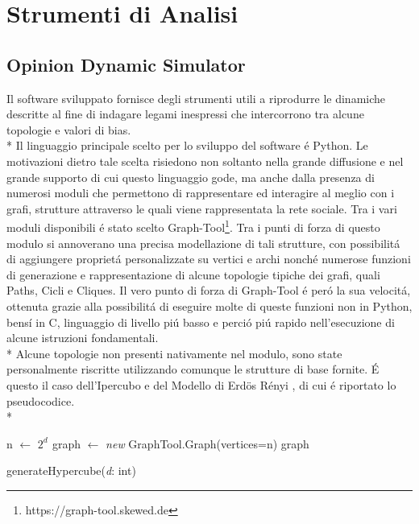 \documentclass[../Tesi.tex]{subfiles}
\begin{document}
\chapter{Strumenti di Analisi}
\section{Opinion Dynamic Simulator}
Il software sviluppato fornisce degli strumenti utili a riprodurre le dinamiche descritte al fine di indagare legami inespressi che intercorrono tra alcune topologie e valori di bias.\\*
Il linguaggio principale scelto per lo sviluppo del software \'e Python. Le motivazioni dietro tale scelta risiedono non soltanto nella grande diffusione e nel grande supporto di cui questo linguaggio gode, ma anche dalla presenza di numerosi moduli che permettono di rappresentare ed interagire al meglio con i grafi, strutture attraverso le quali viene rappresentata la rete sociale.
Tra i vari moduli disponibili \'e stato scelto Graph-Tool\footnote{https://graph-tool.skewed.de}. Tra i punti di forza di questo modulo si annoverano una precisa modellazione di tali strutture, con possibilit\'a di aggiungere propriet\'a personalizzate su vertici e archi nonch\'e numerose funzioni di generazione e rappresentazione di alcune topologie tipiche dei grafi, quali Paths, Cicli e Cliques. Il vero punto di forza di Graph-Tool \'e per\'o la sua velocit\'a, ottenuta grazie alla possibilit\'a di eseguire molte di queste funzioni non in Python, bens\'i in C, linguaggio di livello pi\'u basso e perci\'o pi\'u rapido nell'esecuzione di alcune istruzioni fondamentali.\\*
Alcune topologie non presenti nativamente nel modulo, sono state personalmente riscritte utilizzando comunque le strutture di base fornite. \'E questo il caso dell'Ipercubo e del Modello di Erd{\"o}s R\'enyi \cite{Erdos:1959:pmd}, di cui \'e riportato lo pseudocodice.\\*

\begin{algorithm}[H]
  n $\gets$ $2^{d^{\mathrm{}}}$\;
  graph $\gets$ \emph{new} GraphTool.Graph(vertices=n)\;
  \Return graph\;
\caption{generateHypercube(\emph{d}: int)}
\end{algorithm}
\end{document}
